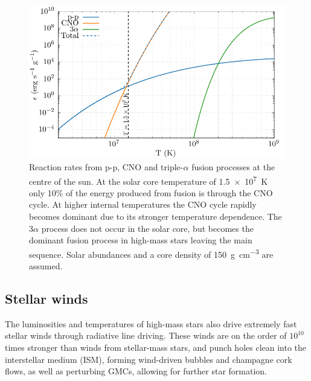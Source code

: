 \begin{figure}[h]
  \centering
  \includegraphics{assets/reaction-rate/reaction-solar.pdf}
  \caption[Reaction rates at the center of the sun]{Reaction rates from p-p, CNO and triple-$\alpha$ fusion processes at the centre of the sun. At the solar core temperature of \SI{1.5e7}{\kelvin} only 10\% of the energy produced from fusion is through the CNO cycle. At higher internal temperatures the CNO cycle rapidly becomes dominant due to its stronger temperature dependence. The $3\alpha$ process does not occur in the solar core, but becomes the dominant fusion process in high-mass stars leaving the main sequence. Solar abundances and a core density of \SI{150}{\gram\per\centi\metre\cubed} are assumed.}
\end{figure}


\subsection{Stellar winds}

The luminosities and temperatures of high-mass stars also drive extremely fast stellar winds through radiative line driving.
These winds are on the order of $10^{10}$ times stronger than winds from stellar-mass stars, and punch holes clean into the interstellar medium (ISM), forming wind-driven bubbles and champagne cork flows, as well as perturbing GMCs, allowing for further star formation.

